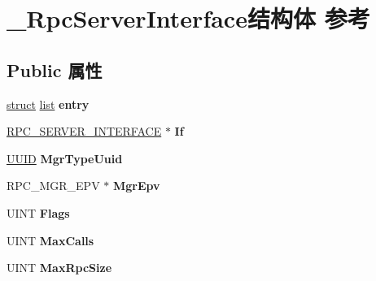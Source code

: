 \hypertarget{struct___rpc_server_interface}{}\section{\+\_\+\+Rpc\+Server\+Interface结构体 参考}
\label{struct___rpc_server_interface}
\subsection*{Public 属性}
\begin{DoxyCompactItemize}
\item 
\mbox{\label{struct___rpc_server_interface_a5b7a1fd37b252ee8e7df1bd10b316ea5}} 
\hyperlink{interfacestruct}{struct} \hyperlink{classlist}{list} {\bfseries entry}
\item 
\mbox{\label{struct___rpc_server_interface_a583650fbb0051d291f7c468d3a5be98a}} 
\hyperlink{struct___r_p_c___s_e_r_v_e_r___i_n_t_e_r_f_a_c_e}{R\+P\+C\+\_\+\+S\+E\+R\+V\+E\+R\+\_\+\+I\+N\+T\+E\+R\+F\+A\+CE} $\ast$ {\bfseries If}
\item 
\mbox{\label{struct___rpc_server_interface_aa792ae61def8d01b82a59ae8e1cbd09d}} 
\hyperlink{interface_g_u_i_d}{U\+U\+ID} {\bfseries Mgr\+Type\+Uuid}
\item 
\mbox{\label{struct___rpc_server_interface_ab63682c8fb5b5277e2de1999336597a8}} 
R\+P\+C\+\_\+\+M\+G\+R\+\_\+\+E\+PV $\ast$ {\bfseries Mgr\+Epv}
\item 
\mbox{\label{struct___rpc_server_interface_a26cf6d3dfa8e863bc13c617dd3c86454}} 
U\+I\+NT {\bfseries Flags}
\item 
\mbox{\label{struct___rpc_server_interface_ae03ca6fa76100318135d39e003ce8d11}} 
U\+I\+NT {\bfseries Max\+Calls}
\item 
\mbox{\label{struct___rpc_server_interface_a3ce2d99b3e6675c22788e4fe9a17553c}} 
U\+I\+NT {\bfseries Max\+Rpc\+Size}
\item 
\mbox{\label{struct___rpc_server_interface_af3cd5f4069afca255962aa5b9621439e}} 

\end{DoxyCompactItemize}
